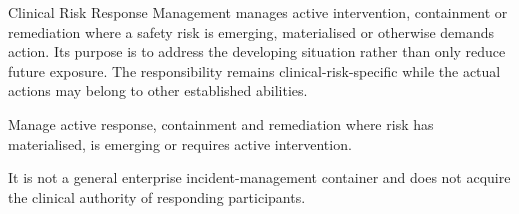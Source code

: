 Clinical Risk Response Management manages active intervention, containment or remediation where a safety risk is emerging, materialised or otherwise demands action. Its purpose is to address the developing situation rather than only reduce future exposure. The responsibility remains clinical-risk-specific while the actual actions may belong to other established abilities.



Manage active response, containment and remediation where risk has materialised, is emerging or requires active intervention.



It is not a general enterprise incident-management container and does not acquire the clinical authority of responding participants.


